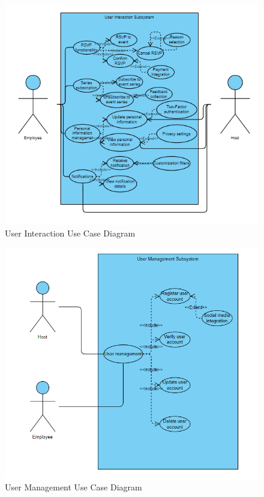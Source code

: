 \documentclass[a4paper,12pt]{article}
\begin{document}
\begin{figure}[H]
    \centering
    \includegraphics[width=\textwidth]{UserInteractionSubsystem.png}
    \caption{User Interaction Use Case Diagram}
    \label{fig:use-case-diagram}
\end{figure}

\begin{figure}[H]
    \centering
    \includegraphics[width=\textwidth]{UserManagementSubsystem.png}
    \caption{User Management Use Case Diagram}
    \label{fig:use-case-diagram}
\end{figure}
\end{document}
